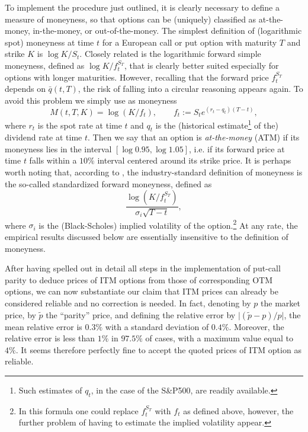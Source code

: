 \documentclass[11pt]{article}
\theoremstyle{remark}
\begin{document}
To implement the procedure just outlined, it is clearly necessary to
define a measure of moneyness, so that options can be (uniquely)
classified as at-the-money, in-the-money, or out-of-the-money. The
simplest definition of (logarithmic spot) moneyness at time $t$ for a
European call or put option with maturity $T$ and strike $K$ is
$\log K/S_t$.  Closely related is the logarithmic forward simple
moneyness, defined as $\log K/f^{S_T}_t$, that is clearly better suited
especially for options with longer maturities. However, recalling that
the forward price $f^{S_T}_t$ depends on $\bar{q}(t,T)$, the risk of
falling into a circular reasoning appears again. To avoid this problem
we simply use as moneyness
\[
M(t,T,K) = \log (K/f_t), \qquad f_t := S_t e^{(r_t-q_t)(T-t)},
\]
where $r_t$ is the spot rate at time $t$ and $q_t$ is the (historical
estimate\footnote{Such estimates of $q_t$, in the case of the S\&P500,
  are readily available.} of the) dividend rate at time $t$.  Then we
say that an option is \emph{at-the-money} (ATM) if its moneyness lies
in the interval $[\log 0.95,\log 1.05]$, i.e. if its forward price at
time $t$ falls within a $10\%$ interval centered around its strike
price.  It is perhaps worth noting that, according to
\cite{CarrWu:03}, the industry-standard definition of moneyness is the
so-called standardized forward moneyness, defined as
\[
\frac{\log(K/f^{S_T}_t)}{\sigma_i \sqrt{T-t}},
\]
where $\sigma_i$ is the (Black-Scholes) implied volatility of the
option.\footnote{In this formula one could replace $f^{S_T}_t$ with
  $f_t$ as defined above, however, the further problem of having to
  estimate the implied volatility appear.}  At any rate, the empirical
results discussed below are essentially insensitive to the definition
of moneyness. 

\medskip

After having spelled out in detail all steps in the implementation of
put-call parity to deduce prices of ITM options from those of
corresponding OTM options, we can now substantiate our claim that ITM
prices can already be considered reliable and no correction is
needed. In fact, denoting by $p$ the market price, by $\tilde{p}$ the
``parity'' price, and defining the relative error by
$\lvert(\tilde{p}-p)/p\rvert$, the mean relative error is $0.3\%$ with
a standard deviation of $0.4\%$. Moreover, the relative error is less
than $1\%$ in $97.5\%$ of cases, with a maximum value equal to
$4\%$. It seems therefore perfectly fine to accept the quoted prices
of ITM option as reliable.
\end{document}
